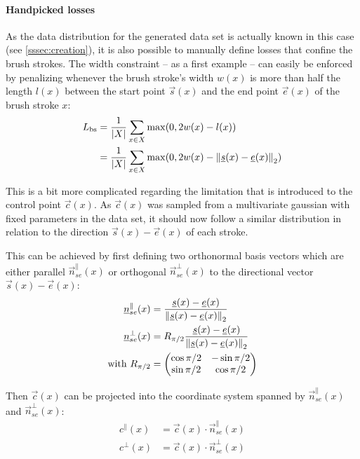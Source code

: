 \paragraph{Handpicked losses} As the data distribution for the generated data set
is actually known in this case (see \ref{sssec:creation}), it is also possible to
manually define losses that confine the brush strokes.
The width constraint -- as a first example -- can easily be enforced by penalizing
whenever the brush stroke's width $w(x)$ is more than half the length $l(x)$ between the
start point $\vec{s}(x)$ and the end point $\vec{e}(x)$ of the brush stroke $x$:
\begin{align}
    L_{\text{bs}} & = \frac{1}{\vert X \vert}\sum_{x \in X} \max(0, 2w(x) - l(x)) \\
    & = \frac{1}{\vert X \vert}\sum_{x \in X} \max(0, 2w(x) - \left\lVert\underline s(x) - \underline e(x)\right\rVert_2)
\end{align}

This is a bit more complicated regarding the limitation that is introduced to the
control point $\vec{c}(x)$.
As $\vec{c}(x)$ was sampled from a multivariate gaussian with fixed parameters in
the data set, it should now follow a similar distribution in relation to the direction
$\vec{s}(x) - \vec{e}(x)$ of each stroke.

This can be achieved by first defining two orthonormal basis vectors which are either
parallel $\vec{n}_{se}^\parallel(x)$ or orthogonal $\vec{n}_{se}^\bot(x)$ to the directional
vector $\vec{s}(x) - \vec{e}(x)$:
\begin{align}
    \underline n_{se}^\parallel(x) & = \frac{\underline s(x) - \underline e(x)}{\left\lVert\underline s(x) - \underline e(x)\right\rVert_2} \\
    \underline n_{se}^\bot(x) & = R_{\pi/2} \frac{\underline s(x) - \underline e(x)}{\left\lVert\underline s(x) - \underline e(x)\right\rVert_2} \\
    \text{with } R_{\pi/2} & =
    \begin{pmatrix}
        \cos \pi/2 & -\sin \pi/2 \\
        \sin \pi/2 & \cos \pi/2
    \end{pmatrix}
\end{align}

Then $\vec{c}(x)$ can be projected into the coordinate system spanned by  $\vec{n}_{se}^\parallel(x)$
and $\vec{n}_{se}^\bot(x)$:
\begin{align}
    c^\parallel(x) & = \vec{c}(x) \cdot \vec{n}_{se}^\parallel(x)  \\
    c^\bot(x) & = \vec{c}(x) \cdot \vec{n}_{se}^\bot(x)  \\
\end{align}

